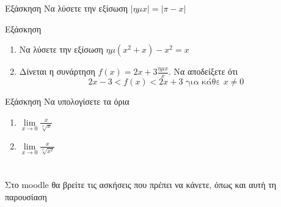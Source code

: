 \documentclass[greek]{beamer}
\begin{document}
\begin{frame}{Εξάσκηση}
  Να λύσετε την εξίσωση $|ημx|=|π-x|$
\end{frame}

\begin{frame}{Εξάσκηση}
  \begin{enumerate}
    \item Να λύσετε την εξίσωση $ημ(x^2+x)-x^2=x$ \pause
    \item Δίνεται η συνάρτηση $f(x)=2x+3\frac{ημx}{x}$. Να αποδείξετε ότι
          $$2x-3<f(x)<2x+3 \text{ για κάθε } x\ne 0$$
  \end{enumerate}
\end{frame}

\begin{frame}{Εξάσκηση}
  Να υπολογίσετε τα όρια
  \begin{enumerate}
    \item $\lim\limits_{x \to 0}{ \frac{x}{\sqrt[3]{x}} }$ \pause
    \item $\lim\limits_{x \to 0}{ \frac{x}{\sqrt[3]{x^2}} }$
  \end{enumerate}
\end{frame}

\section{}
\begin{frame}
  Στο moodle θα βρείτε τις ασκήσεις που πρέπει να κάνετε, όπως και αυτή τη παρουσίαση
\end{frame}
\end{document}
